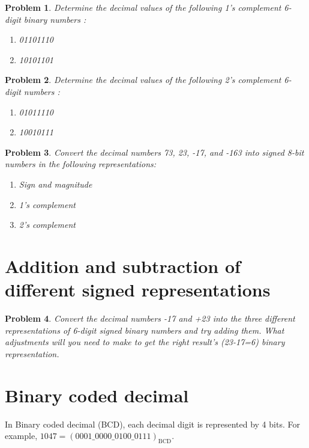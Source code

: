 \documentclass{article}
\newtheorem{prob}{Problem}
\begin{document}
\begin{prob}
  Determine the decimal values of the following 1’s complement 6-digit binary numbers :
  \begin{enumerate}
  \item 01101110
  \item 10101101
  \end{enumerate}
\end{prob}
\vspace{20em}

\begin{prob}
  Determine the decimal values of the following 2’s complement 6-digit numbers :
  \begin{enumerate}
  \item 01011110
  \item 10010111
  \end{enumerate}
\end{prob}
\vspace{20em}

\begin{prob}
  Convert the decimal numbers 73, 23, -17, and -163 into signed 8-bit numbers in the
  following representations:
  \begin{enumerate}
    \item Sign and magnitude
    \item 1’s complement
    \item 2’s complement
  \end{enumerate}
\end{prob}
\vspace{20em}

\section{Addition and subtraction of different signed representations}

\begin{prob}
  Convert the decimal numbers -17 and +23 into the three different
  representations of 6-digit signed binary numbers and try adding them. What
  adjustments will you need to make to get the right result's (23-17=6) binary representation.
\end{prob}
\vspace{20em}


\section{Binary coded decimal}
In Binary coded decimal (BCD), each decimal digit is represented by 4 bits. For
example, $1047 = (0001\_0000\_0100\_0111)_{\text{BCD}}$.
\end{document}
